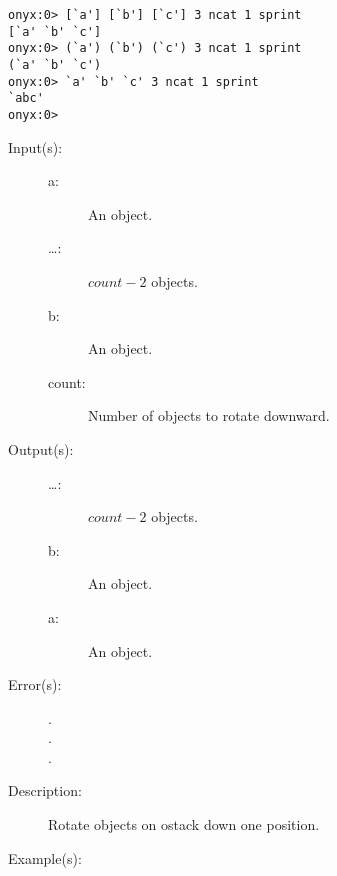 \begin{description}
\begin{description}
\begin{verbatim}
onyx:0> [`a'] [`b'] [`c'] 3 ncat 1 sprint
[`a' `b' `c']
onyx:0> (`a') (`b') (`c') 3 ncat 1 sprint
(`a' `b' `c')
onyx:0> `a' `b' `c' 3 ncat 1 sprint
`abc'
onyx:0>
		\end{verbatim}
	\end{description}
\label{systemdict:ndn}
\item[{\onyxop{a \dots b count}{ndn}{\dots b a}}: ]
	\begin{description}\item[]
	\item[Input(s): ]
		\begin{description}\item[]
		\item[a: ]
			An object.
		\item[\dots: ]
			$count - 2$ objects.
		\item[b: ]
			An object.
		\item[count: ]
			Number of objects to rotate downward.
		\end{description}
	\item[Output(s): ]
		\begin{description}\item[]
		\item[\dots: ]
			$count - 2$ objects.
		\item[b: ]
			An object.
		\item[a: ]
			An object.
		\end{description}
	\item[Error(s): ]
		\begin{description}\item[]
		\item[.]
		\item[.]
		\item[.]
		\end{description}
	\item[Description: ]
		Rotate  objects on ostack down one position.
	\item[Example(s): ]\begin{verbatim}


\end{verbatim}
\end{description}
\end{description}
